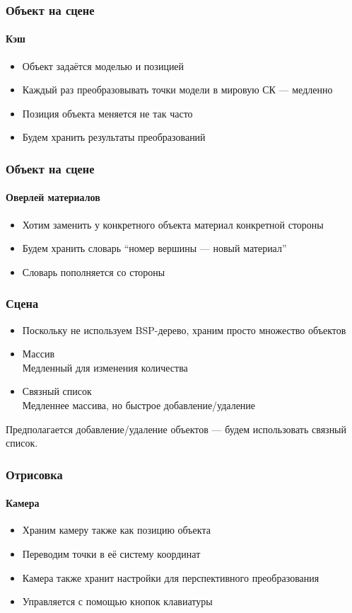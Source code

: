 \documentclass{beamer}
\begin{document}
\begin{frame}
\frametitle{Объект на сцене}
\framesubtitle{Кэш}

\begin{itemize}
\item Объект задаётся моделью и позицией
\item Каждый раз преобразовывать точки модели в мировую СК --- медленно
\item Позиция объекта меняется не так часто
\item Будем хранить результаты преобразований
\end{itemize}
\end{frame}

\begin{frame}
\frametitle{Объект на сцене}
\framesubtitle{Оверлей материалов}

\begin{itemize}
\item Хотим заменить у конкретного объекта материал конкретной стороны
\item Будем хранить словарь ``номер вершины --- новый материал''
\item Словарь пополняется со стороны
\end{itemize}
\end{frame}

\begin{frame}
\frametitle{Сцена}

\begin{itemize}
\item Поскольку не используем BSP-дерево, храним просто множество объектов
\item Массив \\
Медленный для изменения количества
\item Связный список \\
Медленнее массива, но быстрое добавление/удаление
\end{itemize}
Предполагается добавление/удаление объектов --- будем использовать связный список.
\end{frame}

\begin{frame}
\frametitle{Отрисовка}
\framesubtitle{Камера}

\begin{itemize}
\item Храним камеру также как позицию объекта
\item Переводим точки в её систему координат
\item Камера также хранит настройки для перспективного преобразования
\item Управляется с помощью кнопок клавиатуры
\end{itemize}
\end{frame}
\end{document}
